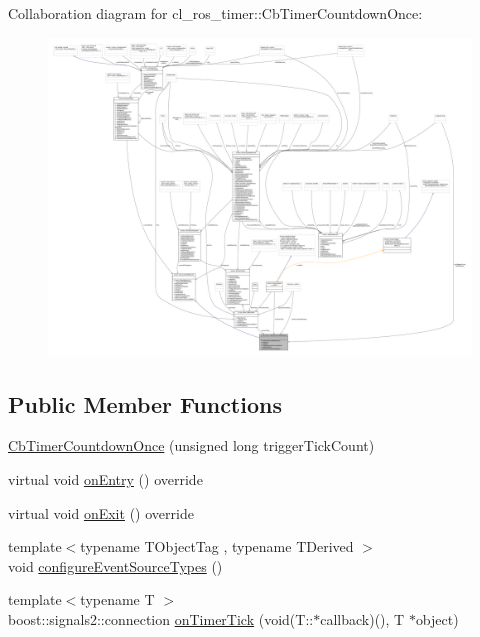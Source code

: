 Collaboration diagram for cl\+\_\+ros\+\_\+timer\+:\+:Cb\+Timer\+Countdown\+Once\+:
\nopagebreak
\begin{figure}[H]
\begin{center}
\leavevmode
\includegraphics[width=350pt]{classcl__ros__timer_1_1CbTimerCountdownOnce__coll__graph}
\end{center}
\end{figure}
\subsection*{Public Member Functions}
\begin{DoxyCompactItemize}
\item 
\hyperlink{classcl__ros__timer_1_1CbTimerCountdownOnce_a41161c36e1c3b1767c02884d28649ccd}{Cb\+Timer\+Countdown\+Once} (unsigned long trigger\+Tick\+Count)
\item 
virtual void \hyperlink{classcl__ros__timer_1_1CbTimerCountdownOnce_a613662c4a4106ece0ce1dee198d1aba2}{on\+Entry} () override
\item 
virtual void \hyperlink{classcl__ros__timer_1_1CbTimerCountdownOnce_ab602b778a299b42e8cc9f4bf3da0a234}{on\+Exit} () override
\item 
{\footnotesize template$<$typename T\+Object\+Tag , typename T\+Derived $>$ }\\void \hyperlink{classcl__ros__timer_1_1CbTimerCountdownOnce_a12c63ab8ca0d90859f6b7fc1212b504e}{configure\+Event\+Source\+Types} ()
\item 
{\footnotesize template$<$typename T $>$ }\\boost\+::signals2\+::connection \hyperlink{classcl__ros__timer_1_1CbTimerCountdownOnce_a1e20a8c9a9907db8a1d7dacf8c60ad27}{on\+Timer\+Tick} (void(T\+::$\ast$callback)(), T $\ast$object)
\end{DoxyCompactItemize}

